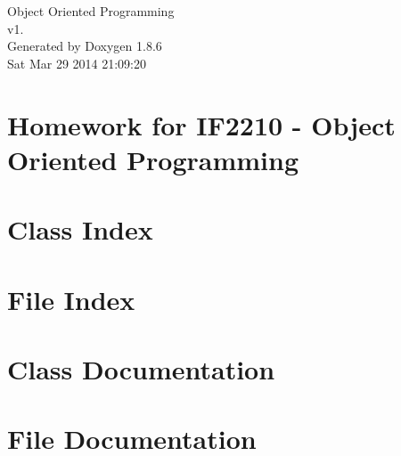 \documentclass[twoside]{book}
\newcommand{\clearemptydoublepage}{%
  \newpage{\pagestyle{empty}\cleardoublepage}%
}
\begin{document}
\hypersetup{pageanchor=false}
\begin{titlepage}
\vspace*{7cm}
\begin{center}%
{\Large Object Oriented Programming \\[1ex]\large v1. }\\
\vspace*{1cm}
{\large Generated by Doxygen 1.8.6}\\
\vspace*{0.5cm}
{\small Sat Mar 29 2014 21:09:20}\\
\end{center}
\end{titlepage}
\clearemptydoublepage
\tableofcontents
\clearemptydoublepage
{}
\hypersetup{pageanchor=true}

\chapter{Homework for I\-F2210 -\/ Object Oriented Programming}
\label{index}\hypertarget{index}{}
\chapter{Class Index}

\chapter{File Index}

\chapter{Class Documentation}






\chapter{File Documentation}





















\newpage
{}
{}
\printindex
\end{document}
